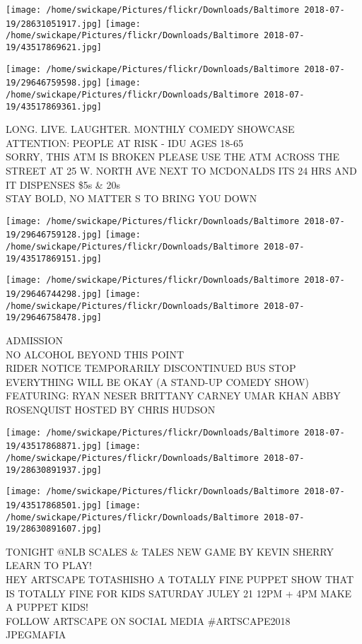 \documentclass[10pt,letterpaper]{article}
\begin{document}
\texttt{[image: /home/swickape/Pictures/flickr/Downloads/Baltimore 2018-07-19/28631051917.jpg]}
\texttt{[image: /home/swickape/Pictures/flickr/Downloads/Baltimore 2018-07-19/43517869621.jpg]}

\texttt{[image: /home/swickape/Pictures/flickr/Downloads/Baltimore 2018-07-19/29646759598.jpg]}
\texttt{[image: /home/swickape/Pictures/flickr/Downloads/Baltimore 2018-07-19/43517869361.jpg]}

LONG. LIVE. LAUGHTER.  MONTHLY COMEDY SHOWCASE\\
ATTENTION: PEOPLE AT RISK {-} IDU AGES 18{-}65\\
SORRY, THIS ATM IS BROKEN PLEASE USE THE ATM ACROSS THE STREET AT 25 W. NORTH AVE NEXT TO MCDONALDS ITS 24 HRS AND IT DISPENSES \$5s \& 20s\\
STAY BOLD, NO MATTER S TO BRING YOU DOWN
\pagebreak

\texttt{[image: /home/swickape/Pictures/flickr/Downloads/Baltimore 2018-07-19/29646759128.jpg]}
\texttt{[image: /home/swickape/Pictures/flickr/Downloads/Baltimore 2018-07-19/43517869151.jpg]}

\texttt{[image: /home/swickape/Pictures/flickr/Downloads/Baltimore 2018-07-19/29646744298.jpg]}
\texttt{[image: /home/swickape/Pictures/flickr/Downloads/Baltimore 2018-07-19/29646758478.jpg]}

ADMISSION\\
NO ALCOHOL BEYOND THIS POINT\\
RIDER NOTICE TEMPORARILY DISCONTINUED BUS STOP\\
EVERYTHING WILL BE OKAY (A STAND{-}UP COMEDY SHOW) FEATURING: RYAN NESER BRITTANY CARNEY UMAR KHAN ABBY ROSENQUIST HOSTED BY CHRIS HUDSON
\pagebreak

\texttt{[image: /home/swickape/Pictures/flickr/Downloads/Baltimore 2018-07-19/43517868871.jpg]}
\texttt{[image: /home/swickape/Pictures/flickr/Downloads/Baltimore 2018-07-19/28630891937.jpg]}

\texttt{[image: /home/swickape/Pictures/flickr/Downloads/Baltimore 2018-07-19/43517868501.jpg]}
\texttt{[image: /home/swickape/Pictures/flickr/Downloads/Baltimore 2018-07-19/28630891607.jpg]}

TONIGHT @NLB SCALES \& TALES NEW GAME BY KEVIN SHERRY LEARN TO PLAY!\\
HEY ARTSCAPE TOTASHISHO A TOTALLY FINE PUPPET SHOW THAT IS TOTALLY FINE FOR KIDS SATURDAY JULEY 21 12PM + 4PM MAKE A PUPPET KIDS!\\
FOLLOW ARTSCAPE ON SOCIAL MEDIA \#ARTSCAPE2018\\
JPEGMAFIA
\pagebreak
\end{document}
